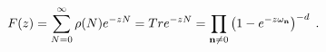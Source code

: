 \begin{equation}\label{f}
F(z) = \sum_{N = 0}^\infty \rho(N) e^{- z N} 
= Tr e^{- z N} = \prod_{{\bf n} \ne 0} 
\left( 1 - e^{- z \omega_{{\bf n}}} \right)^{- d} \; . 
\end{equation}

